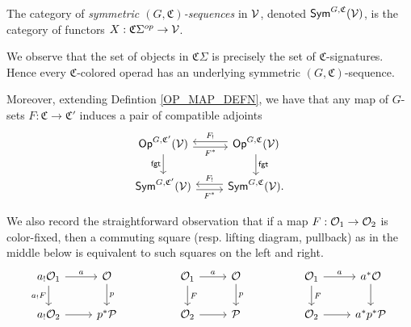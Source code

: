 \documentclass[a4paper,10pt
,draft
]{article}%
\renewcommand{\1}{\ensuremath{\mathbb{id}}}
\begin{document}
\begin{definition}
      The category of \textit{symmetric $(G,\mathfrak C)$-sequences} in $\mathcal V$, denoted $\mathsf{Sym}^{G,\mathfrak C}(\mathcal V)$, is
      the category of functors $X: \mathfrak C \Sigma^{op} \to \mathcal V$.
\end{definition}

\begin{remark}
      \label{COLOR_CHANGE_REM}
      We observe that the set of objects in $\mathfrak C\Sigma$ is precisely the set of $\mathfrak C$-signatures.
      Hence every $\mathfrak C$-colored operad has an underlying symmetric $(G,\mathfrak C)$-sequence.
      
      Moreover, extending Defintion \ref{OP_MAP_DEFN}, we have that any map of $G$-sets
      $F: \mathfrak C \to \mathfrak C'$ induces a pair of compatible adjoints
      \begin{equation}
            \label{COLOR_CHANGE_EQ}
            \begin{tikzcd}
                  \Op^{G, \mathfrak C'}(\V) \arrow[r, shift right, "F^{\**}"'] \arrow[d, "\mathsf{fgt}"']
                  &
                  \Op^{G, \mathfrak C}(\V) \arrow[l, shift right, "F_!"'] \arrow[d, "\mathsf{fgt}"]
                  \\
                  \Sym^{G, \mathfrak C'}(\V) \arrow[r, shift right, "F^{\**}"']
                  &
                  \Sym^{G, \mathfrak C}(\V) \arrow[l, shift right, "F_!"'].
            \end{tikzcd}
      \end{equation}

      We also record the straightforward observation that if a map $F: \mathcal{O}_1 \to \mathcal{O}_2$ is color-fixed, then
      a commuting square (resp. lifting diagram, pullback) as in the middle below is
      equivalent to such squares on the left and right.
      \begin{equation}
            \label{COLOR_SQ_EQ}
            \begin{tikzcd}
                  a_! \O_1 \arrow[d, "a_! F"'] \arrow[r, "a"]
                  &
                  \O \arrow[d, "p"]
                  &&
                  \O_1 \arrow[d, "F"] \arrow[r, "a"]
                  &
                  \O \arrow[d, "p"]
                  &&
                  \O_1 \arrow[d, "F"] \arrow[r, "a"]
                  &
                  a^{\**} \O \arrow[d]
                  \\
                  a_! \O_2 \arrow[r]
                  &
                  p^{\**} \P
                  &&
                  \O_2 \arrow[r]
                  &
                  \P
                  &&
                  \O_2 \arrow[r]
                  &
                  a^{\**} p^{\**} \P
            \end{tikzcd}
      \end{equation}
\end{remark}
\end{document}
